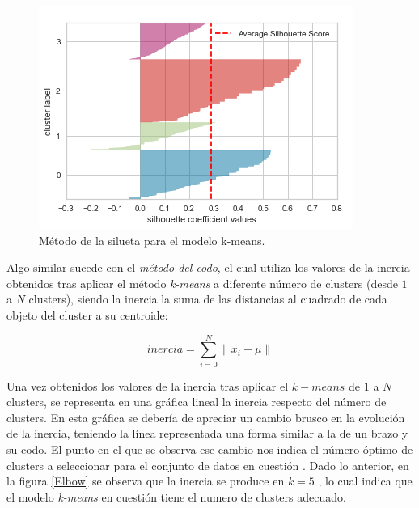 \begin{figure}[h!]
	\centering
	\includegraphics[width=1
	\linewidth]{IMAGENES/Silhouette}
	\caption{Método de la silueta para el modelo k-means.}
	\label{Silhouette}
\end{figure} 

Algo similar sucede con el \textit{método del codo}, el cual utiliza los valores de la inercia obtenidos tras aplicar el método \textit{k-means} a diferente número de clusters (desde $1$ a $N$ clusters), siendo la inercia la suma de las distancias al cuadrado de cada objeto del cluster a su centroide:

\begin{equation}
	inercia = \sum_{i = 0}^{N}  \parallel x_{i} - \mu  \parallel
\end{equation}

Una vez obtenidos los valores de la inercia tras aplicar el $k-means$ de $1$ a $N$ clusters, se representa en una gráfica lineal la inercia respecto del número de clusters. En esta gráfica se debería de apreciar un cambio brusco en la evolución de la inercia, teniendo la línea representada una forma similar a la de un brazo y su codo. El punto en el que se observa ese cambio nos indica el número óptimo de clusters a seleccionar para el conjunto de datos en cuestión \cite{Moya2022}. Dado lo anterior, en la figura \ref{Elbow} se observa que la inercia se produce en $k = 5 $ , lo cual indica que el modelo \textit{k-means} en cuestión tiene el numero de clusters adecuado. 

